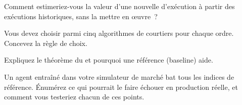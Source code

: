 \begin{interviewq}\label{iq:ml:reinforcement-learning-foundations:3}
Comment estimeriez-vous la valeur d'une nouvelle  d'exécution à partir des exécutions historiques, sans la mettre en œuvre~?
\end{interviewq}

\begin{interviewq}\label{iq:ml:reinforcement-learning-foundations:4}
Vous devez choisir parmi cinq algorithmes de courtiers pour chaque ordre. Concevez la règle de choix.
\end{interviewq}

\begin{interviewq}\label{iq:ml:reinforcement-learning-foundations:5}
Expliquez le théorème du  et pourquoi une référence (baseline) aide.
\end{interviewq}

\begin{interviewq}\label{iq:ml:reinforcement-learning-foundations:6}
Un agent entraîné dans votre simulateur de marché bat tous les indices de référence. Énumérez ce qui pourrait le faire échouer en production réelle, et comment vous testeriez
chacun de ces points.
\end{interviewq}

